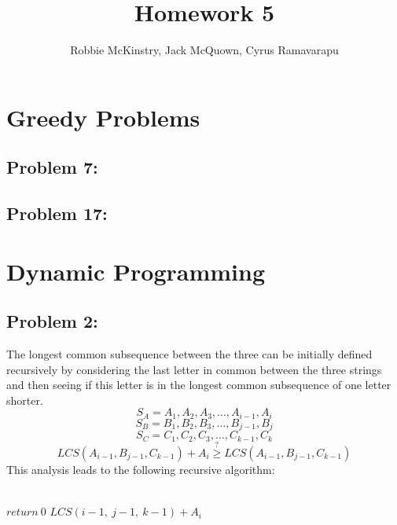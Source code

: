 \documentclass[12pt]{article}
\begin{document}
\title{Homework 5}
\author{Robbie McKinstry, Jack McQuown, Cyrus Ramavarapu}
\renewcommand{\today}{12 September 2016}
\renewcommand{\baselinestretch}{1.5}

\maketitle

\section*{Greedy Problems}
\subsection*{Problem 7:}

\subsection*{Problem 17:}

\section*{Dynamic Programming}
\subsection*{Problem 2:}
The longest common subsequence between the three can be
initially defined recursively by considering the last 
letter in common between the three strings and then 
seeing if this letter is in the longest common subsequence
of one letter shorter.
\[
S_A = A_1, A_2, A_3,\dots,A_{i-1},A_i
\]
\[
S_B = B_1, B_2, B_3,\dots,B_{j-1},B_j
\]
\[
S_C = C_1, C_2, C_3,\dots,C_{k-1},C_k
\] 
\[
LCS(A_{i-1}, B_{j-1}, C_{k-1}) + A_i \overset{?}{\geq} LCS(A_{i-1}, B_{j-1}, C_{k-1}) 
\]
This analysis leads to the following recursive algorithm:\\\\
\begin{algorithmic}[H]
    \State $return\ 0$
\EndIf
{}
    \State $LCS(i-1,\ j-1,\ k-1) + A_i$
\Else 
    \Else
        \Else
            \Else
            \EndIf
       \EndIf
   \EndIf
\EndIf  
\EndFunction
\end{algorithmic}
\end{document}
